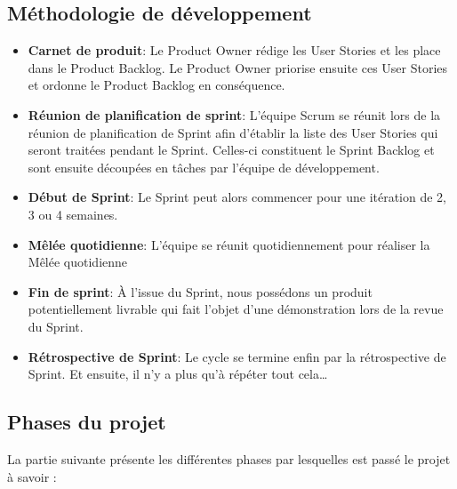 \subsection{Méthodologie de développement}

\begin{itemize}
  \item \textbf{Carnet de produit}: 
        Le Product Owner rédige les User Stories et les place dans le Product Backlog.
        Le Product Owner priorise ensuite ces User Stories et ordonne le Product
        Backlog en conséquence.
    \\
    \item \textbf{Réunion de planification de sprint}: 
        L’équipe Scrum se réunit lors de la réunion de planification de Sprint afin
        d’établir la liste des User Stories qui seront traitées pendant le Sprint. Celles-ci
        constituent le Sprint Backlog et sont ensuite découpées en tâches par l’équipe
        de développement.
    \\    
    \item \textbf{Début de Sprint}: 
        Le Sprint peut alors commencer pour une itération de 2, 3 ou 4 semaines.
    \\    
    \item \textbf{Mêlée quotidienne}: 
        L’équipe se réunit quotidiennement pour réaliser la Mêlée quotidienne
    \\    
    \item \textbf{Fin de sprint}: 
        À l’issue du Sprint, nous possédons un produit potentiellement livrable qui fait l’objet d’une démonstration lors de la revue du Sprint.
    \\    
    \item \textbf{Rétrospective de Sprint}: 
        Le cycle se termine enfin par la rétrospective de Sprint. Et ensuite, il n’y a plus qu’à répéter tout cela…
\end{itemize}

\subsection{Phases du projet}

La partie suivante présente les différentes phases par lesquelles est passé le projet à savoir :
\\

